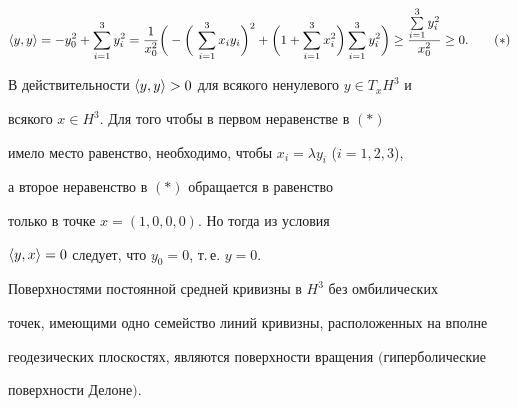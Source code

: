 \begin{equation}


\la y,y\ra=-y^2_0+\sum^3_{i=1}y^2_i=\frac{1}{x^2_0}\bigg(


-\bigg(\,\sum^3_{i=1}x_i y_i\bigg)^2+\bigg(1+


\sum^3_{i=1}x^2_i\bigg)\sum^3_{i=1}y^2_i\bigg)\ge


\frac{\sum\limits^3_{i=1}y^2_i}{x^2_0}\ge0.\tag{$*$}


\end{equation}





В действительности $\langle y,y\rangle>0$ для всякого ненулевого $y\in T_x H^3$ и


всякого $x\in H^3$. Для того чтобы в первом неравенстве в $(*)$


имело место равенство, необходимо, чтобы $x_i=\lambda y_i$ ($i=1,2,3$),


а второе неравенство в $(*)$ обращается в равенство


только в точке $x=(1,0,0,0)$. Но тогда из условия


$\langle y,x\rangle=0$ следует, что $y_0=0$, т.\,е. $y=0$.





\begin{thm}


Поверхностями постоянной средней кривизны в $H^3$ без омбилических


точек, имеющими одно семейство линий кривизны, расположенных на вполне


геодезических плоскостях, являются поверхности вращения $($гиперболические


поверхности Делоне$)$.


\end{thm}





